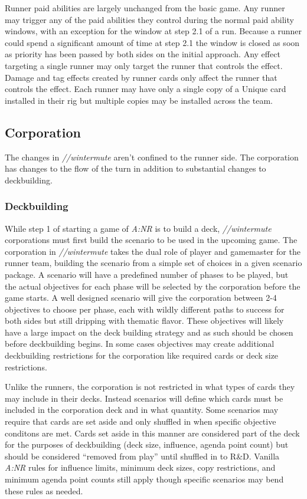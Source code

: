 \documentclass[titlepage]{article}
\begin{document}
Runner paid abilities are largely unchanged from the basic game. Any runner may trigger any of the paid abilities they control during the normal paid ability windows, with an exception for the window at step 2.1 of a run. Because a runner could spend a significant amount of time at step 2.1 the window is closed as soon as priority has been passed by both sides on the initial approach. Any effect targeting a single runner may only target the runner that controls the effect. Damage and tag effects created by runner cards only affect the runner that controls the effect. Each runner may have only a single copy of a Unique card installed in their rig but multiple copies may be installed across the team.

\subsection{Corporation}

The changes in \emph{//wintermute} aren't confined to the runner side. The corporation has changes to the flow of the turn in addition to substantial changes to deckbuilding.

\subsubsection{Deckbuilding}
While step 1 of starting a game of \emph{A:NR} is to build a deck, \emph{//wintermute} corporations must first build the scenario to be used in the upcoming game. The corporation in \emph{//wintermute} takes the dual role of player and gamemaster for the runner team, building the scenario from a simple set of choices in a given scenario package. A scenario will have a predefined number of phases to be played, but the actual objectives for each phase will be selected by the corporation before the game starts. A well designed scenario will give the corporation between 2-4 objectives to choose per phase, each with wildly different paths to success for both sides but still dripping with thematic flavor. These objectives will likely have a large impact on the deck building strategy and as such should be chosen before deckbuilding begins. In some cases objectives may create additional deckbuilding restrictions for the corporation like required cards or deck size restrictions.  

Unlike the runners, the corporation is not restricted in what types of cards they may include in their decks. Instead scenarios will define which cards must be included in the corporation deck and in what quantity. Some scenarios may require that cards are set aside and only shuffled in when specific objective conditons are met. Cards set aside in this manner are considered part of the deck for the purposes of deckbuilding (deck size, influence, agenda point count) but should be considered ``removed from play'' until shuffled in to R\&D. Vanilla \emph{A:NR} rules for influence limits, minimum deck sizes, copy restrictions, and minimum agenda point counts still apply though specific scenarios may bend these rules as needed.
\end{document}
